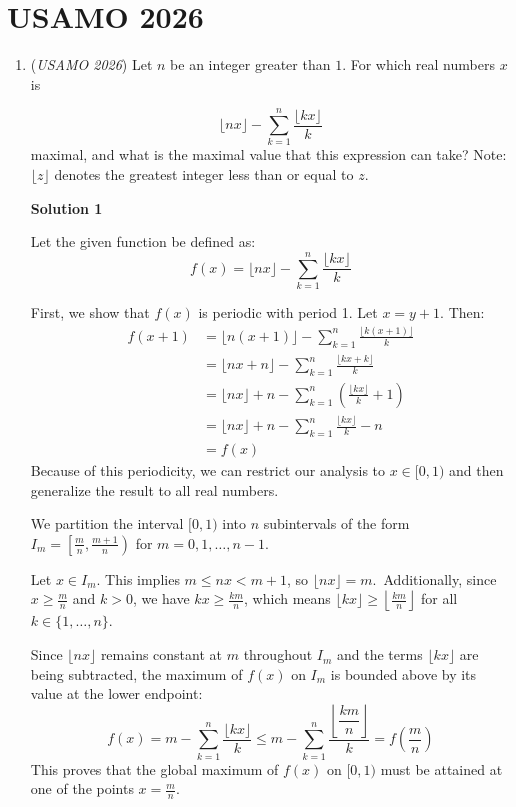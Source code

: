 \section{USAMO 2026}
        \begin{enumerate}
        	\item (\textit{USAMO 2026}) Let $n$ be an integer greater than $1$. For which real numbers $x$ is 

 \[\lfloor nx\rfloor-\sum_{k=1}^n\frac{\lfloor kx\rfloor}{k}\]
maximal, and what is the maximal value that this expression can take?
Note: $\lfloor z\rfloor$ denotes the greatest integer less than or equal to $z$.


 



\textbf{Solution 1}

Let the given function be defined as:
 \[f(x) = \lfloor nx \rfloor - \sum_{k=1}^{n} \frac{\lfloor kx \rfloor}{k}\]

 First, we show that $f(x)$ is periodic with period 1. Let $x = y + 1$. Then:\begin{align*}f(x+1) &= \lfloor n(x+1) \rfloor - \sum_{k=1}^n \frac{\lfloor k(x+1) \rfloor}{k} \\&= \lfloor nx + n \rfloor - \sum_{k=1}^n \frac{\lfloor kx + k \rfloor}{k} \\&= \lfloor nx \rfloor + n - \sum_{k=1}^n \left( \frac{\lfloor kx \rfloor}{k} + 1 \right) \\&= \lfloor nx \rfloor + n - \sum_{k=1}^n \frac{\lfloor kx \rfloor}{k} - n \\&= f(x)\end{align*}
Because of this periodicity, we can restrict our analysis to $x \in [0, 1)$ and then generalize the result to all real numbers.

 We partition the interval $[0, 1)$ into $n$ subintervals of the form $I_m = \left[\frac{m}{n}, \frac{m+1}{n}\right)$ for $m = 0, 1, \dots, n-1$.

 Let $x \in I_m$. This implies $m \le nx < m+1$, so $\lfloor nx \rfloor = m$. Additionally, since $x \ge \frac{m}{n}$ and $k > 0$, we have $kx \ge \frac{km}{n}$, which means $\lfloor kx \rfloor \ge \left\lfloor \frac{km}{n} \right\rfloor$ for all $k \in \{1, \dots, n\}$.

 Since $\lfloor nx \rfloor$ remains constant at $m$ throughout $I_m$ and the terms $\lfloor kx \rfloor$ are being subtracted, the maximum of $f(x)$ on $I_m$ is bounded above by its value at the lower endpoint:
 \[f(x) = m - \sum_{k=1}^n \frac{\lfloor kx \rfloor}{k} \le m - \sum_{k=1}^n \frac{\left\lfloor \dfrac{km}{n} \right\rfloor}{k} = f\left(\dfrac{m}{n}\right)\]This proves that the global maximum of $f(x)$ on $[0, 1)$ must be attained at one of the points $x = \frac{m}{n}$.


\end{enumerate}
